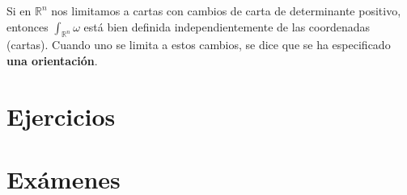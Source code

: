 \documentclass[palatino, bibnumbers]{apuntes}
\begin{document}
 \indent Si en $\mathbb{R}^n$ nos limitamos a cartas con cambios de carta de determinante positivo, entonces $\int_{\mathbb{R}^n}\omega$ está bien definida independientemente de las coordenadas (cartas).
 Cuando uno se limita a estos cambios, se dice que se ha especificado \textbf{una orientación}.
 
\appendix

\chapter{Ejercicios}

\chapter{Exámenes}


\printindex
\end{document}
